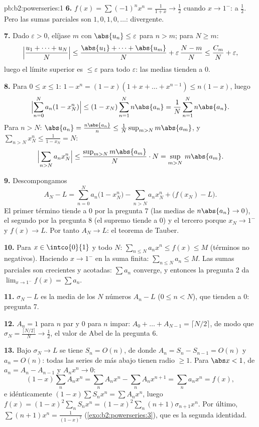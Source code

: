 \begin{solution}{pb:b2:powerseries:1}
\textbf{6.} $f(x) = \sum(-1)^nx^n = \frac{1}{1+x} \to \frac12$
cuando $x \to 1^-$:  a $\frac12$. Pero las sumas
parciales son $1, 0, 1, 0, \dots$: divergente.

\textbf{7.} Dado $\varepsilon > 0$, elíjase $m$ con $\abs{u_n} \leq
\varepsilon$ para $n > m$; para $N \geq m$:
\[
\Bigl|\frac{u_1 + \dots + u_N}{N}\Bigr|
\leq \frac{\abs{u_1} + \dots + \abs{u_m}}{N} +
\varepsilon\,\frac{N - m}{N}
\leq \frac{C_m}{N} + \varepsilon,
\]
luego el límite superior es $\leq \varepsilon$ para todo
$\varepsilon$: las medias tienden a $0$.

\textbf{8.} Para $0 \leq x \leq 1$: $1 - x^n = (1-x)(1 + x + \dots +
x^{n-1}) \leq n(1-x)$, luego
\[
\Bigl|\sum_{n=0}^N a_n(1 - x_N^n)\Bigr|
\leq (1 - x_N)\sum_{n=1}^N n\abs{a_n}
= \frac1N\sum_{n=1}^{N}n\abs{a_n} .
\]
Para $n > N$: $\abs{a_n} = \frac{n\abs{a_n}}{n} \leq
\frac{1}{N}\sup_{m>N}m\abs{a_m}$, y $\sum_{n>N}x_N^n \leq \frac{1}{1
- x_N} = N$:
\[
\Bigl|\sum_{n>N}a_nx_N^n\Bigr|
\leq \frac{\sup_{m>N}m\abs{a_m}}{N}\cdot N
= \sup_{m>N}\,m\abs{a_m} .
\]

\textbf{9.} Descompongamos
\[
A_N - L = \sum_{n=0}^{N}a_n\bigl(1 - x_N^n\bigr)
- \sum_{n>N}a_nx_N^n + \bigl(f(x_N) - L\bigr) .
\]
El primer término tiende a $0$ por la pregunta 7 (las medias de
$n\abs{a_n} \to 0$), el segundo por la pregunta 8 (el supremo tiende
a $0$) y el tercero porque $x_N \to 1^-$ y $f(x) \to L$. Por tanto
$A_N \to L$: el teorema de Tauber.

\textbf{10.} Para $x \in \intco{0}{1}$ y todo $N$: $\sum_{n\leq
N}a_nx^n \leq f(x) \leq M$ (términos no negativos). Haciendo $x \to
1^-$ en la suma finita: $\sum_{n\leq N}a_n \leq M$. Las sumas
parciales son crecientes y acotadas: $\sum a_n$ converge, y entonces
la pregunta 2 da $\lim_{x\to1^-}f(x) = \sum a_n$.

\textbf{11.} $\sigma_N - L$ es la media de los $N$ números $A_n - L$
($0 \leq n < N$), que tienden a $0$: pregunta 7.

\textbf{12.} $A_n = 1$ para $n$ par y $0$ para $n$ impar: $A_0 +
\dots + A_{N-1} = \lceil N/2\rceil$, de modo que $\sigma_N =
\frac{\lceil N/2\rceil}{N} \to \frac12$, el valor de Abel de la
pregunta 6.

\textbf{13.} Bajo $\sigma_N \to L$ se tiene $S_n = O(n)$, de donde
$A_n = S_n - S_{n-1} = O(n)$ y $a_n = O(n)$: todas las series de más
abajo tienen radio $\geq 1$. Para $\abs x < 1$, de $a_n = A_n -
A_{n-1}$ y $A_nx^n \to 0$:
\[
(1-x)\sum_n A_nx^n = \sum_n A_nx^n - \sum_n A_nx^{n+1}
= \sum_n a_nx^n = f(x),
\]
e idénticamente $(1-x)\sum S_nx^n = \sum A_nx^n$, luego $f(x) =
(1-x)^2\sum_n S_nx^n = (1-x)^2\sum_n(n+1)\sigma_{n+1}x^n$. Por
último, $\sum(n+1)x^n = \frac{1}{(1-x)^2}$
(\cref{exo:b2:powerseries:3}), que es la segunda identidad.


\end{solution}
